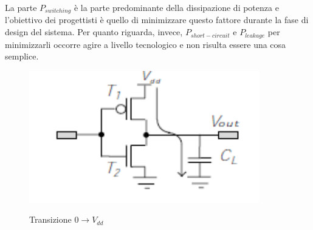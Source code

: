 La parte $P_{switching}$ è la parte predominante della dissipazione di potenza e l'obiettivo dei progettisti è quello di minimizzare questo fattore durante la fase di design del sistema. Per quanto riguarda, invece, $P_{short-circuit}$ e $P_{leakage}$ per minimizzarli occorre agire a livello tecnologico e non risulta essere una cosa semplice.\\
\begin{figure}
\centering
\includegraphics[width=10cm]{img/vddoutput.png}
\label{fig:vddoutput}
\caption{Transizione $0 \rightarrow V_{dd}$}
\end{figure}